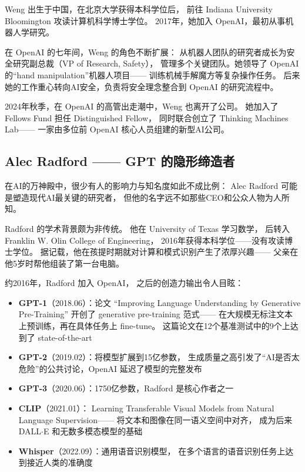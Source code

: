 Weng 出生于中国，在北京大学获得本科学位后，
前往 Indiana University Bloomington 攻读计算机科学博士学位。
2017年，她加入 OpenAI，最初从事机器人学研究。

在 OpenAI 的七年间，Weng 的角色不断扩展：
从机器人团队的研究者成长为安全研究副总裁（VP of Research, Safety），
管理多个关键团队。她领导了 OpenAI 的``hand manipulation''机器人项目——
训练机械手解魔方等复杂操作任务。
后来她的工作重心转向AI安全，负责将安全理念整合到 OpenAI 的研究流程中。

2024年秋季，在 OpenAI 的高管出走潮中，Weng 也离开了公司。
她加入了 Fellows Fund 担任 Distinguished Fellow，
同时联合创立了 Thinking Machines Lab——
一家由多位前 OpenAI 核心人员组建的新型AI公司。


\subsection{Alec Radford —— GPT 的隐形缔造者}
\label{subsec:alec-radford}

在AI的万神殿中，很少有人的影响力与知名度如此不成比例：
Alec Radford 可能是塑造现代AI最关键的研究者，
但他的名字远不如那些CEO和公众人物为人所知。

Radford 的学术背景颇为非传统。
他在 University of Texas 学习数学，
后转入 Franklin W. Olin College of Engineering，
2016年获得本科学位——没有攻读博士学位。
据记载，他在孩提时期就对计算和模式识别产生了浓厚兴趣——
父亲在他5岁时帮他组装了第一台电脑。

约2016年，Radford 加入 OpenAI，
之后的创造力输出令人目眩：

\begin{itemize}[noitemsep]
  \item \textbf{GPT-1}（2018.06）：论文 ``Improving Language Understanding by
        Generative Pre-Training'' 开创了 generative pre-training 范式——
        在大规模无标注文本上预训练，再在具体任务上 fine-tune。
        这篇论文在12个基准测试中的9个上达到了 state-of-the-art
  \item \textbf{GPT-2}（2019.02）：将模型扩展到15亿参数，
        生成质量之高引发了``AI是否太危险''的公共讨论，OpenAI 延迟了模型的完整发布
  \item \textbf{GPT-3}（2020.06）：1750亿参数，Radford 是核心作者之一
  \item \textbf{CLIP}（2021.01）：
        Learning Transferable Visual Models from Natural Language Supervision——
        将文本和图像在同一语义空间中对齐，
        成为后来 DALL$\cdot$E 和无数多模态模型的基础
  \item \textbf{Whisper}（2022.09）：通用语音识别模型，
        在多个语言的语音识别任务上达到接近人类的准确度
\end{itemize}

